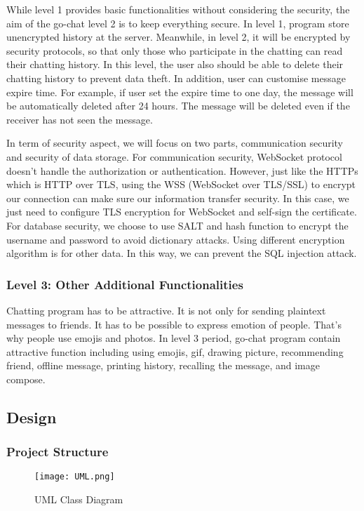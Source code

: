 \documentclass[a4paper,11pt]{article}
\begin{document}
While level 1 provides basic functionalities without considering the security, the aim of the go-chat level 2 is to keep everything secure. In level 1, program store unencrypted history at the server. Meanwhile, in level 2, it will be encrypted by security protocols, so that only those who participate in the chatting can read their chatting history. In this level, the user also should be able to delete their chatting history to prevent data theft. In addition, user can customise message expire time. For example, if user set the expire time to one day, the message will be automatically deleted after 24 hours. The message will be deleted even if the receiver has not seen the message.

In term of security aspect, we will focus on two parts, communication security and security of data storage. For communication security, WebSocket protocol doesn’t handle the authorization or authentication. However, just like the HTTPs which is HTTP over TLS, using the WSS (WebSocket over TLS/SSL) to encrypt our connection can make sure our information transfer security. In this case, we just need to configure TLS encryption for WebSocket and self-sign the certificate. For database security, we choose to use SALT and hash function to encrypt the username and password to avoid dictionary attacks. Using different encryption algorithm is for other data. In this way, we can prevent the SQL injection attack.

\subsubsection{Level 3: Other Additional Functionalities}

Chatting program has to be attractive. It is not only for sending plaintext messages to friends. It has to be possible to express emotion of people. That's why people use emojis and photos. In level 3 period, go-chat program contain attractive function including using emojis, gif, drawing picture, recommending friend, offline message, printing history, recalling the message, and image compose.
\subsection{Design}
\subsubsection{Project Structure}
\begin{figure}[h]
\centering
\texttt{[image: UML.png]}
\caption{\label{fig:UML}UML Class Diagram}
\end{figure}
\end{document}
